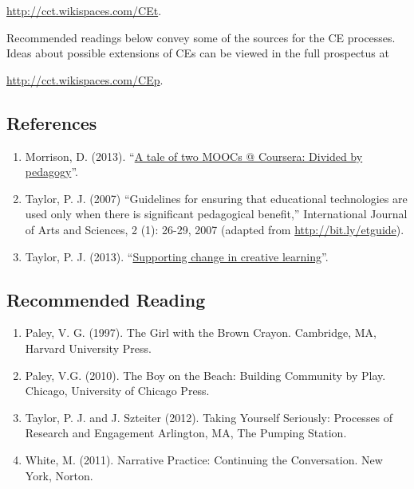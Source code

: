 \url{http://cct.wikispaces.com/CEt}.

Recommended readings below convey some of the sources for the CE
processes.~ Ideas about possible extensions of CEs can be viewed in the
full prospectus at

\url{http://cct.wikispaces.com/CEp}.

\subsection{References}\label{collab-ex-references}

\begin{enumerate}
\def\labelenumi{\arabic{enumi}.}
\item
  Morrison, D. (2013). ``\href{http://bit.ly/164uqkJ}{A tale of two
  MOOCs @ Coursera: Divided by pedagogy}''.
\item
  Taylor, P. J. (2007) ``Guidelines for ensuring that educational
  technologies are used only when there is significant pedagogical
  benefit,'' International Journal of Arts and Sciences, 2 (1): 26-29,
  2007 (adapted from \url{http://bit.ly/etguide}).
\item
  Taylor, P. J. (2013). ``\href{http://wp.me/p1gwfa-vv}{Supporting
  change in creative learning}''.
\end{enumerate}

\subsection{Recommended Reading}\label{recommended-reading}

\begin{enumerate}
\def\labelenumi{\arabic{enumi}.}
\item
  Paley, V. G. (1997). The Girl with the Brown Crayon. Cambridge, MA,
  Harvard University Press.
\item
  Paley, V.G. (2010). The Boy on the Beach: Building Community by Play.
  Chicago, University of Chicago Press.
\item
  Taylor, P. J. and J. Szteiter (2012). Taking Yourself Seriously:
  Processes of Research and Engagement Arlington, MA, The Pumping
  Station.
\item
  White, M. (2011). Narrative Practice: Continuing the Conversation. New
  York, Norton.
\end{enumerate}
